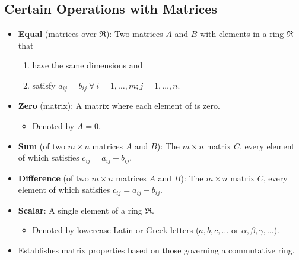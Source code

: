 \documentclass[titlepage]{article}
\numberwithin{figure}{section}
\numberwithin{equation}{section}
\numberwithin{theorem}{section}
\begin{document}
\subsection{Certain Operations with Matrices}
\begin{itemize}
    \item \textbf{Equal} (matrices over $\mathfrak{R}$): Two matrices $A$ and $B$ with elements in a ring $\mathfrak{R}$ that
    \begin{enumerate}
        \item have the same dimensions and
        \item satisfy $a_{ij}=b_{ij}\ \forall\ i=1,\dots,m;j=1,\dots,n$.
    \end{enumerate}
    \item \textbf{Zero} (matrix): A matrix where each element of is zero.
    \begin{itemize}
        \item Denoted by $A=0$.
    \end{itemize}
    \item \textbf{Sum} (of two $m\times n$ matrices $A$ and $B$): The $m\times n$ matrix $C$, every element of which satisfies $c_{ij}=a_{ij}+b_{ij}$.
    \item \textbf{Difference} (of two $m\times n$ matrices $A$ and $B$): The $m\times n$ matrix $C$, every element of which satisfies $c_{ij}=a_{ij}-b_{ij}$.
    \item \textbf{Scalar}: A single element of a ring $\mathfrak{R}$.
    \begin{itemize}
        \item Denoted by lowercase Latin or Greek letters ($a,b,c,\dots$ or $\alpha,\beta,\gamma,\dots$).
    \end{itemize}
    \item Establishes matrix properties based on those governing a commutative ring.
\end{itemize}
\end{document}
